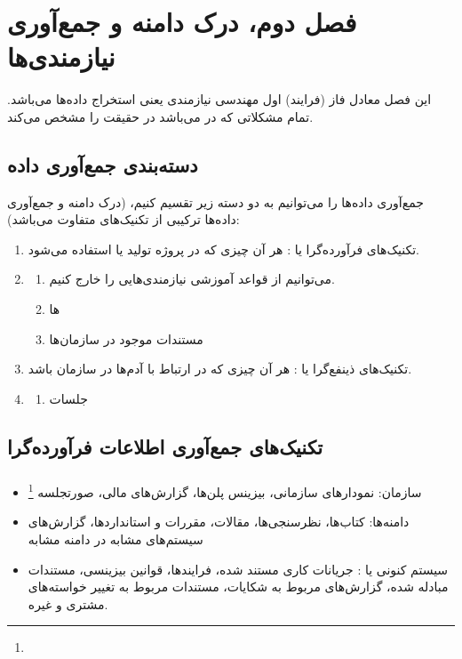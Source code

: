 \section{فصل دوم، درک دامنه و جمع‌آوری نیازمندی‌ها}

این فصل معادل فاز (فرایند) اول مهندسی نیازمندی یعنی استخراج داده‌ها می‌باشد.
تمام مشکلاتی که در  می‌باشد در حقیقت  را مشخص می‌کند.

\subsection{دسته‌بندی جمع‌آوری داده}

جمع‌آوری داده‌ها را می‌توانیم به دو دسته زیر تقسیم کنیم، (درک دامنه و جمع‌آوری
داده‌ها ترکیبی از تکنیک‌های متفاوت می‌باشد):

\begin{enumerate}
    \item تکنیک‌های فرآورده‌گرا یا : هر آن چیزی که در پروژه
    تولید یا استفاده می‌شود.
    \item \begin{enumerate}
        \item می‌توانیم از قواعد آموزشی نیازمندی‌هایی را خارج کنیم.
        \item {}ها
        \item مستندات موجود در سازمان‌ها
    \end{enumerate}
    \item تکنیک‌های ذینفع‌گرا یا : هر آن چیزی که در
    ارتباط با آدم‌ها در سازمان باشد.
    \item \begin{enumerate}
        \item جلسات
    \end{enumerate}
\end{enumerate}

\subsection{تکنیک‌های جمع‌آوری اطلاعات فرآورده‌گرا}

\subsubsection{}

\begin{itemize}
    \item سازمان: نمودار‌های سازمانی، بیزینس پلن‌ها، گزارش‌های مالی، صورتجلسه
    \footnote{}
    \item دامنه‌ها: کتاب‌ها، نظرسنجی‌ها، مقالات، مقررات و استاندارد‌ها،
    گزارش‌های سیستم‌های مشابه در دامنه مشابه
    \item سیستم کنونی یا : جریانات کاری مستند شده، فرایند‌ها،
    قوانین بیزینسی، مستندات مبادله شده، گزارش‌های مربوط به شکایات، مستندات مربوط
    به تغییر خواسته‌های مشتری و غیره.
\end{itemize}

